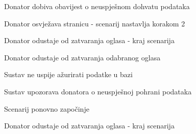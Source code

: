 \begin{packed_item}
\begin{packed_item}
\begin{packed_enum}
								\item Donator dobiva obavijest o neuspješnom dohvatu podataka
								\item
									\begin{packed_enum}
										\item Donator osvježava stranicu - scenarij nastavlja korakom 2
										\item Donator odustaje od zatvaranja oglasa - kraj scenarija
									\end{packed_enum}
							\end{packed_enum}
							\item[3.a] Donator odustaje od zatvaranja odabranog oglasa
							\item[4.a] Sustav ne uspije ažurirati podatke u bazi
							\item[] \begin{packed_enum}
								\item Sustav upozorava donatora o neuspješnoj pohrani podataka
								\item
									\begin{packed_enum}
										\item Scenarij ponovno započinje
										\item Donator odustaje od zatvaranja oglasa - kraj scenarija
									\end{packed_enum}	
							\end{packed_enum}					
						\end{packed_item}
					\end{packed_item}	

